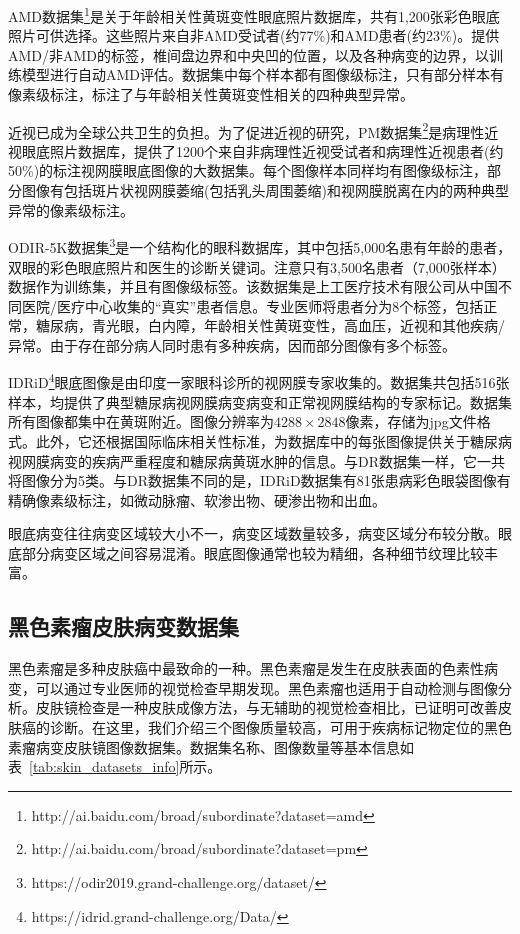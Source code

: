 AMD数据集\footnote{http://ai.baidu.com/broad/subordinate?dataset=amd}是关于年龄相关性黄斑变性眼底照片数据库，共有1,200张彩色眼底照片可供选择。这些照片来自非AMD受试者(约77\%)和AMD患者(约23\%)。提供AMD/非AMD的标签，椎间盘边界和中央凹的位置，以及各种病变的边界，以训练模型进行自动AMD评估。数据集中每个样本都有图像级标注，只有部分样本有像素级标注，标注了与年龄相关性黄斑变性相关的四种典型异常。

近视已成为全球公共卫生的负担。为了促进近视的研究，PM数据集\footnote{http://ai.baidu.com/broad/subordinate?dataset=pm}是病理性近视眼底照片数据库，提供了1200个来自非病理性近视受试者和病理性近视患者(约50\%)的标注视网膜眼底图像的大数据集。每个图像样本同样均有图像级标注，部分图像有包括斑片状视网膜萎缩(包括乳头周围萎缩)和视网膜脱离在内的两种典型异常的像素级标注。

ODIR-5K数据集\footnote{https://odir2019.grand-challenge.org/dataset/}是一个结构化的眼科数据库，其中包括5,000名患有年龄的患者，双眼的彩色眼底照片和医生的诊断关键词。注意只有3,500名患者（7,000张样本）数据作为训练集，并且有图像级标签。该数据集是上工医疗技术有限公司从中国不同医院/医疗中心收集的“真实”患者信息。专业医师将患者分为8个标签，包括正常，糖尿病，青光眼，白内障，年龄相关性黄斑变性，高血压，近视和其他疾病/异常。由于存在部分病人同时患有多种疾病，因而部分图像有多个标签。

IDRiD\footnote{https://idrid.grand-challenge.org/Data/}眼底图像是由印度一家眼科诊所的视网膜专家收集的。数据集共包括516张样本，均提供了典型糖尿病视网膜病变病变和正常视网膜结构的专家标记。数据集所有图像都集中在黄斑附近。图像分辨率为$4288\times 2848$像素，存储为jpg文件格式。此外，它还根据国际临床相关性标准，为数据库中的每张图像提供关于糖尿病视网膜病变的疾病严重程度和糖尿病黄斑水肿的信息。与DR数据集一样，它一共将图像分为5类。与DR数据集不同的是，IDRiD数据集有81张患病彩色眼袋图像有精确像素级标注，如微动脉瘤、软渗出物、硬渗出物和出血。

眼底病变往往病变区域较大小不一，病变区域数量较多，病变区域分布较分散。眼底部分病变区域之间容易混淆。眼底图像通常也较为精细，各种细节纹理比较丰富。


\subsection{黑色素瘤皮肤病变数据集}\label{subsec:original_dermatoscope_ds_intro}
黑色素瘤是多种皮肤癌中最致命的一种。黑色素瘤是发生在皮肤表面的色素性病变，可以通过专业医师的视觉检查早期发现。黑色素瘤也适用于自动检测与图像分析。皮肤镜检查是一种皮肤成像方法，与无辅助的视觉检查相比，已证明可改善皮肤癌的诊断。在这里，我们介绍三个图像质量较高，可用于疾病标记物定位的黑色素瘤病变皮肤镜图像数据集。数据集名称、图像数量等基本信息如表~\ref{tab:skin_datasets_info}所示。

